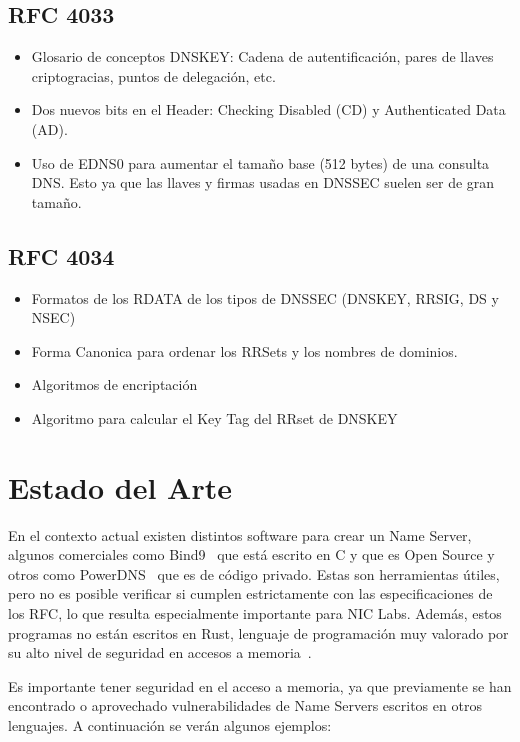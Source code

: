\subsection{RFC 4033}
\begin{itemize}
    \item Glosario de conceptos DNSKEY: Cadena de autentificación, pares de llaves criptogracias, puntos de delegación, etc.
    \item Dos nuevos bits en el Header: Checking Disabled (CD) y Authenticated Data (AD).
    \item Uso de EDNS0 para aumentar el tamaño base (512 bytes) de una consulta DNS. Esto ya que las llaves y firmas usadas en DNSSEC suelen ser de gran tamaño.
\end{itemize}

\subsection{RFC 4034}
\begin{itemize}
    \item Formatos de los RDATA de los tipos de DNSSEC (DNSKEY, RRSIG, DS y NSEC)
    \item Forma Canonica para ordenar los RRSets y los nombres de dominios.
    \item Algoritmos de encriptación
    \item Algoritmo para calcular el Key Tag del RRset de DNSKEY
\end{itemize}

\section{Estado del Arte}
En el contexto actual existen distintos software para crear un Name Server, algunos comerciales como Bind9~\cite{Bind9} que está escrito en C y que es Open Source y otros como PowerDNS~\cite{PowerDNS} que es de código privado. Estas son herramientas útiles, pero no es posible verificar si cumplen estrictamente con las especificaciones de los RFC, lo que resulta especialmente importante para NIC Labs. Además, estos programas no están escritos en Rust, lenguaje de programación muy valorado por su alto nivel de seguridad en accesos a memoria~\cite{SafeRust}.

Es importante tener seguridad en el acceso a memoria, ya que previamente se han encontrado o aprovechado vulnerabilidades de Name Servers escritos en otros lenguajes. A continuación se verán algunos ejemplos:

